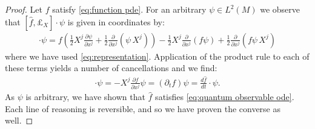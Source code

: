 \documentclass[final,leqno]{siamltex1213}
\newcommand{\pder}[2]{\ensuremath{\frac{ \partial #1}{\partial #2}}}
\begin{document}
\begin{proof}
	Let $f$ satisfy \eqref{eq:function pde}.
	For an arbitrary $\psi \in L^{2}(M)$ we observe that $[ \hat{f} , \pounds_{X}] \cdot \psi$ is given in coordinates by:
	\begin{align}
		[ \hat{f} , \pounds_{X} ] \cdot \psi = f \left( \frac{1}{2} X^{j} \pder{\psi}{x^{j}} + \frac{1}{2} \pder{}{x^{j}} ( \psi \, X^{j} ) \right)
			- \frac{1}{2} X^{j} \pder{}{x^{j}}( f \psi)  + \frac{1}{2} \pder{}{x^{j}} (f \psi \, X^{j} )
	\end{align}
	where we have used \eqref{eq:representation}.  
	Application of the product rule to each of these terms yields a number of cancellations and we find:
	\begin{align}
		[ \hat{f} , \pounds_{X} ] \cdot \psi = - X^{j} \pder{f}{x^{j}} \psi = (\partial_{t} f )\psi = \frac{d \hat{f} }{dt} \cdot \psi.
	\end{align}
	As $\psi$ is arbitrary, we have shown that $\hat{f}$ satisfies \eqref{eq:quantum observable ode}.
	Each line of reasoning is reversible, and so we have proven the converse as well.
	

\end{proof}
\end{document}
